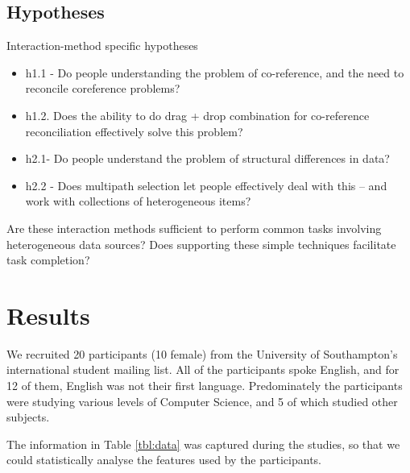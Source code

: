 \documentclass{sigchi}
\begin{document}
\subsection{Hypotheses}
Interaction-method specific hypotheses
\begin{itemize}
	\item h1.1 - Do people understanding the problem of co-reference, and the need to reconcile coreference problems?
	\item h1.2. Does the ability to do drag + drop combination for co-reference reconciliation effectively solve this problem?
	\item h2.1- Do people understand the problem of structural differences in data?
	\item h2.2 - Does multipath selection let people effectively deal with this -- and work with collections of heterogeneous items?
\end{itemize}
Are these interaction methods sufficient to perform common tasks involving heterogeneous data sources?  Does supporting these simple techniques facilitate task completion?

\section{Results}

We recruited 20 participants (10 female) from the University of Southampton's international student mailing list.  All of the participants spoke English, and for 12 of them, English was not their first language.  Predominately the participants were studying various levels of Computer Science, and 5 of which studied other subjects. 

The information in Table \ref{tbl:data} was captured during the studies, so that we could statistically analyse the features used by the participants.
\end{document}
